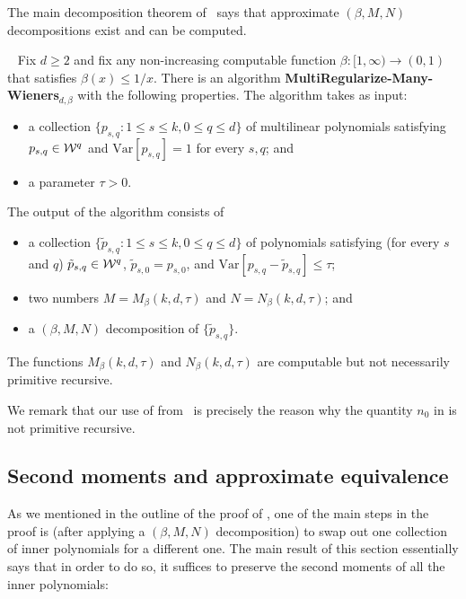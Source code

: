 \documentclass{toc}
\newcommand{\Var}{\mathrm{Var}}
\begin{document}
The main decomposition theorem of~\cite{DS14} says that approximate $(\beta, M, N)$
decompositions exist and can be computed.

\begin{theorem}~\label{thm:decomp} 
Fix $d \geq 2$ and fix any non-increasing computable
function $\beta:  [1,\infty) \to (0,1)$ that satisfies $\beta(x) \leq 1/x$.
There is an algorithm {\bf MultiRegularize-Many-Wieners}$_{d,\beta}$
with the following properties.
The algorithm takes as input:
\begin{itemize}
    \item a collection $\{p_{s,q}: 1 \le s \le k, 0 \le q \le d\}$ of multilinear polynomials
        satisfying $p_{s,q} \in {\cal W}^q$ and $\Var[p_{s,q}] = 1$ for every $s, q$; and
    \item a parameter $\tau > 0$.
\end{itemize}
The output of the algorithm consists of
\begin{itemize}
    \item a collection $\{\tilde p_{s,q}: 1 \le s \le k, 0 \le q \le d\}$
        of polynomials
        satisfying (for every $s$ and $q$) $\tilde p_{s,q} \in {\cal W}^q$,
    $\tilde p_{s,0} = p_{s,0}$, and $\Var[p_{s,q} - \tilde p_{s,q}] \le \tau$;
    \item two numbers $M = M_\beta(k, d, \tau)$ and $N = N_\beta(k, d, \tau)$; and
    \item a $(\beta, M, N)$ decomposition of $\{\tilde p_{s,q}\}$.
\end{itemize}
The functions $M_{\beta}(k,d,\tau)$ and $N_{\beta}(k,d,\tau)$ are computable but not necessarily primitive recursive.
\end{theorem}

We remark that our use of  from~\cite{DS14} is precisely the reason why the quantity $n_0$ in
 is not primitive recursive. 

\subsection{Second moments and approximate equivalence}

As we mentioned in the outline of the proof of , one
of the main steps in the proof is (after applying a $(\beta, M, N)$
decomposition) to swap out one collection of inner polynomials for a different
one. The main result of this section essentially says that in order to do so,
it suffices to preserve the second moments of all the inner polynomials:
\end{document}
